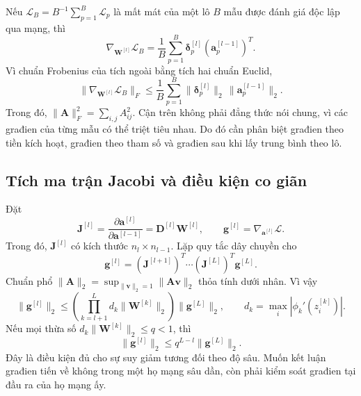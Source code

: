 Nếu $\mathcal L_B=B^{-1}\sum_{p=1}^B\mathcal L_p$ là mất mát của
một lô $B$ mẫu được đánh giá độc lập qua mạng, thì
\begin{equation}
 \nabla_{\mathbf W^{[l]}}\mathcal L_B
 =\frac1B\sum_{p=1}^B
   \boldsymbol\delta_p^{[l]}(\mathbf a_p^{[l-1]})^T.
 \label{kt:eq:batch-gradient}
\end{equation}
Vì chuẩn Frobenius của tích ngoài bằng tích hai chuẩn Euclid,
\begin{equation}
 \|\nabla_{\mathbf W^{[l]}}\mathcal L_B\|_F
 \leq\frac1B\sum_{p=1}^B
             \|\boldsymbol\delta_p^{[l]}\|_2\,
             \|\mathbf a_p^{[l-1]}\|_2.
 \label{kt:eq:batch-bound}
\end{equation}
Trong đó, $\|\mathbf A\|_F^2=\sum_{i,j}A_{ij}^2$. Cận trên
không phải đẳng thức nói chung, vì các građien của từng mẫu có thể
triệt tiêu nhau. Do đó cần phân biệt građien theo tiền kích hoạt,
građien theo tham số và građien sau khi lấy trung bình theo lô.

\subsection{Tích ma trận Jacobi và điều kiện co giãn}

Đặt
\begin{equation}
 \mathbf J^{[l]}=
 \frac{\partial\mathbf a^{[l]}}{\partial\mathbf a^{[l-1]}}
 =\mathbf D^{[l]}\mathbf W^{[l]},\qquad
 \mathbf g^{[l]}=\nabla_{\mathbf a^{[l]}}\mathcal L.
 \label{kt:eq:layer-jacobian}
\end{equation}
Trong đó, $\mathbf J^{[l]}$ có kích thước $n_l\times n_{l-1}$.
Lặp quy tắc dây chuyền cho
\begin{equation}
 \mathbf g^{[l]}
 =(\mathbf J^{[l+1]})^T\cdots(\mathbf J^{[L]})^T\mathbf g^{[L]}.
 \label{kt:eq:jacobian-product}
\end{equation}
Chuẩn phổ $\|\mathbf A\|_2=\sup_{\|\mathbf v\|_2=1}
\|\mathbf A\mathbf v\|_2$ thỏa tính dưới nhân. Vì vậy
\begin{equation}
 \|\mathbf g^{[l]}\|_2
 \leq\left(\prod_{k=l+1}^{L}
   d_k\|\mathbf W^{[k]}\|_2\right)\|\mathbf g^{[L]}\|_2,
 \qquad d_k=\max_i|\phi_k'(z_i^{[k]})|.
 \label{kt:eq:gradient-product-bound}
\end{equation}
Nếu mọi thừa số $d_k\|\mathbf W^{[k]}\|_2\leq q<1$, thì
\begin{equation}
 \|\mathbf g^{[l]}\|_2\leq q^{L-l}\|\mathbf g^{[L]}\|_2.
 \label{kt:eq:gradient-contraction}
\end{equation}
Đây là điều kiện đủ cho sự suy giảm tương đối theo độ sâu. Muốn
kết luận građien tiến về không trong một họ mạng sâu dần, còn phải
kiểm soát građien tại đầu ra của họ mạng ấy.

